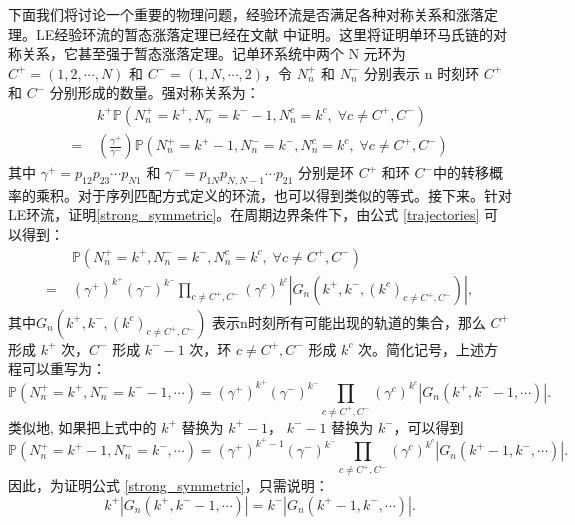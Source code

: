 
下面我们将讨论一个重要的物理问题，经验环流是否满足各种对称关系和涨落定理。LE经验环流的暂态涨落定理已经在文献 \cite{andrieux2007network} 中证明。这里将证明单环马氏链的对称关系，它甚至强于暂态涨落定理。记单环系统中两个 N 元环为  $C^+ = (1,2,\cdots,N)$ 和 $C^- = (1,N,\cdots,2)$，令 $N^+_n$ 和 $N^-_n$ 分别表示 n 时刻环  $C^+$ 和 $C^-$ 分别形成的数量。强对称关系为：
\begin{align} \label{strong_symmetric}
    &\;k^+ \mathbb{P}\left(N^+_n=k^+,N^-_n=k^- -1,N^c_n=k^c,\;\forall c\neq C^+,C^-\right)\\
    =&\; \left(\frac{\gamma^+}{\gamma^-}\right)\mathbb{P}\left(N^+_n=k^+ -1,N^-_n=k^-,N^c_n=k^c,\;\forall c\neq C^+,C^-\right)
\end{align}
其中 $\gamma^+ = p_{12}p_{23}\cdots p_{N1}$ 和 $\gamma^- = p_{1N}p_{N,N-1}\cdots p_{21}$ 分别是环 $C^+$ 和环 $C^-$中的转移概率的乘积。对于序列匹配方式定义的环流，也可以得到类似的等式\cite{pietzonka2021cycle}。接下来。针对LE环流，证明\ref{strong_symmetric}。在周期边界条件下，由公式 \eqref{trajectories} 可以得到：
\begin{align*}
    &\;\mathbb{P}\left(N^+_n=k^+,N^-_n=k^-,N^c_n=k^c,\;\forall c\neq C^+,C^-\right)\\
    =&\; (\gamma^+)^{k^+}(\gamma^-)^{k^-}\prod_{c\neq C^+,C^-}
    \left(\gamma^c\right)^{k^c}\left|G_n(k^+,k^-,(k^c)_{c\neq C^+,C^-})\right|,
\end{align*}
其中$G_n(k^+,k^-,(k^c)_{c\neq C^+,C^-})$ 表示n时刻所有可能出现的轨道的集合，那么 $C^+$ 形成 $k^+$ 次，$C^-$ 形成 $k^- -1$ 次，环 $c\neq C^+,C^-$ 形成 $k^c$ 次。简化记号，上述方程可以重写为：
\begin{equation}\label{temp1}
    \mathbb{P}\left(N^+_n=k^+,N^-_n=k^- -1,\cdots\right)
    = (\gamma^+)^{k^+}(\gamma^-)^{k^-}\prod_{c\neq C^+,C^-}\left(\gamma^c\right)^{k^c}|G_n(k^+,k^- -1,\cdots)|.
\end{equation}
类似地, 如果把上式中的 $k^+$ 替换为 $k^+ -1$， $k^- -1$ 替换为 $k^-$，可以得到
\begin{equation}\label{temp2}
\mathbb{P}\left(N^+_n=k^+ -1,N^-_n=k^-,\cdots\right)
= (\gamma^+)^{k^+ -1}(\gamma^-)^{k^-}\prod_{c\neq C^+,C^-}\left(\gamma^c\right)^{k^c}|G_n(k^+ -1,k^-,\cdots)|.
\end{equation}
因此，为证明公式 \ref{strong_symmetric}，只需说明：
\begin{equation} \label{equal0}
    k^+ |G_n(k^+, k^- -1, \cdots)| = k^-|G_n(k^+ -1,k^-,\cdots)|.
\end{equation}

